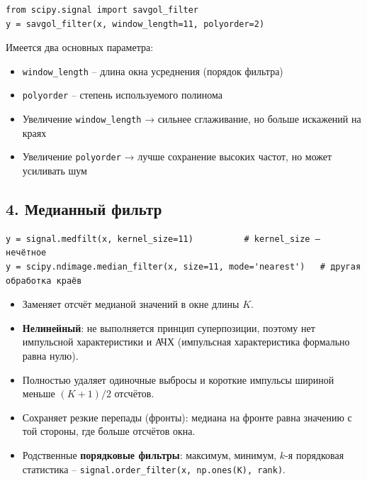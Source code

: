 \documentclass[12pt,a4paper,openany]{book}
\providecommand{\tightlist}{\setlength{\itemsep}{0pt}\setlength{\parskip}{0pt}}
\begin{document}
\begin{Verbatim}[fontsize=\small, breaklines, breakanywhere]
from scipy.signal import savgol_filter
y = savgol_filter(x, window_length=11, polyorder=2)
\end{Verbatim}

Имеется два основных параметра:

\begin{itemize}
\tightlist
\item
  \texttt{window\_\allowbreak{}length} -- длина окна усреднения (порядок фильтра)
\item
  \texttt{polyorder} -- степень используемого полинома
\item
  Увеличение \texttt{window\_\allowbreak{}length} → сильнее сглаживание, но больше искажений на краях
\item
  Увеличение \texttt{polyorder} → лучше сохранение высоких частот, но может усиливать шум
\end{itemize}

\subsection*{4. Медианный фильтр}

\begin{Verbatim}[fontsize=\small, breaklines, breakanywhere]
y = signal.medfilt(x, kernel_size=11)          # kernel_size – нечётное
y = scipy.ndimage.median_filter(x, size=11, mode='nearest')   # другая обработка краёв
\end{Verbatim}

\begin{itemize}
\tightlist
\item
  Заменяет отсчёт медианой значений в окне длины \(K\).
\item
  \textbf{Нелинейный}: не выполняется принцип суперпозиции, поэтому нет импульсной характеристики и АЧХ (импульсная характеристика формально равна нулю).
\item
  Полностью удаляет одиночные выбросы и короткие импульсы шириной меньше \((K+1)/2\) отсчётов.
\item
  Сохраняет резкие перепады (фронты): медиана на фронте равна значению с той стороны, где больше отсчётов окна.
\item
  Родственные \textbf{порядковые фильтры}: максимум, минимум, \(k\)-я порядковая статистика -- \texttt{signal.\allowbreak{}order\_\allowbreak{}filter(\allowbreak{}x,\allowbreak{}\ np.\allowbreak{}ones(\allowbreak{}K),\allowbreak{}\ rank)}.
\end{itemize}
\end{document}
